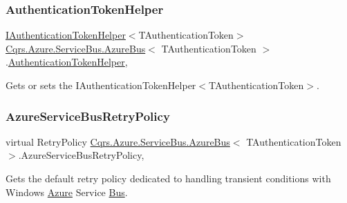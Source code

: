 \subsubsection{\texorpdfstring{Authentication\+Token\+Helper}{AuthenticationTokenHelper}}
{\footnotesize\ttfamily \hyperlink{interfaceCqrs_1_1Authentication_1_1IAuthenticationTokenHelper}{I\+Authentication\+Token\+Helper}$<$T\+Authentication\+Token$>$ \hyperlink{classCqrs_1_1Azure_1_1ServiceBus_1_1AzureBus}{Cqrs.\+Azure.\+Service\+Bus.\+Azure\+Bus}$<$ T\+Authentication\+Token $>$.\hyperlink{classCqrs_1_1Authentication_1_1AuthenticationTokenHelper}{Authentication\+Token\+Helper}\hspace{0.3cm}{\ttfamily [get]}, {\ttfamily [protected]}}



Gets or sets the I\+Authentication\+Token\+Helper$<$\+T\+Authentication\+Token$>$. 

\mbox{\label{classCqrs_1_1Azure_1_1ServiceBus_1_1AzureBus_a88997183f8e6fa9dcef5b883329e95ce_a88997183f8e6fa9dcef5b883329e95ce}} 
\subsubsection{\texorpdfstring{Azure\+Service\+Bus\+Retry\+Policy}{AzureServiceBusRetryPolicy}}
{\footnotesize\ttfamily virtual Retry\+Policy \hyperlink{classCqrs_1_1Azure_1_1ServiceBus_1_1AzureBus}{Cqrs.\+Azure.\+Service\+Bus.\+Azure\+Bus}$<$ T\+Authentication\+Token $>$.Azure\+Service\+Bus\+Retry\+Policy\hspace{0.3cm}{\ttfamily [get]}, {\ttfamily [protected]}}



Gets the default retry policy dedicated to handling transient conditions with Windows \hyperlink{namespaceCqrs_1_1Azure}{Azure} Service \hyperlink{namespaceCqrs_1_1Bus}{Bus}. 

\mbox{\label{classCqrs_1_1Azure_1_1ServiceBus_1_1AzureBus_aaf9469d220fb23cb0521fa76b25ab228_aaf9469d220fb23cb0521fa76b25ab228}} 
